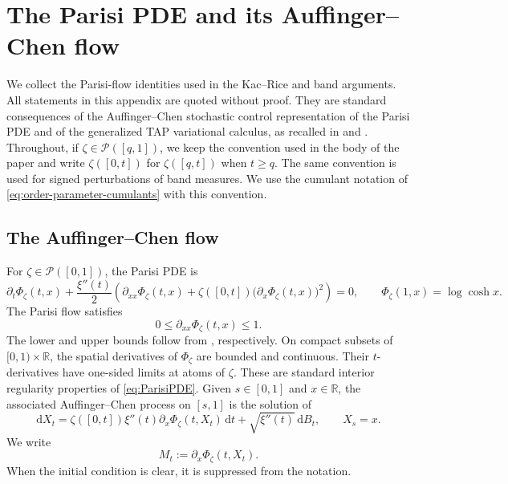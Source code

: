 \documentclass[a4paper,10pt,reqno]{amsart}
\numberwithin{equation}{section}
\newcommand{\dR}{\mathbb{R}}%
\newcommand{\mc}{\mathcal}
\newcommand{\dd}{\mathrm{d}}
\begin{document}
	\appendix
	
	\section{The Parisi PDE and its Auffinger--Chen flow}\label{section:Auffinger}
	
	We collect the Parisi-flow identities used in the Kac--Rice and band
	arguments. All statements in this appendix are quoted without proof. They
	are standard consequences of the Auffinger--Chen stochastic control
	representation of the Parisi PDE and of the generalized TAP variational
	calculus, as recalled in
	\cite{AuffingerChen,AuffingerChenControl,ChenPanchenkoSubag} and
	\cite[Appendix~B]{TAPIsing}.
	Throughout, if $\zeta\in\mc P([q,1])$, we keep the convention used in the
	body of the paper and write $\zeta([0,t])$ for $\zeta([q,t])$ when $t\ge q$.
	The same convention is used for signed perturbations of band measures. We
	use the cumulant notation of \eqref{eq:order-parameter-cumulants} with this
	convention.
	
	\subsection{The Auffinger--Chen flow}
	
	For $\zeta\in\mc P([0,1])$, the Parisi PDE is
	\begin{equation}\label{eq:ParisiPDE}
		\partial_t\Phi_\zeta(t,x)
		+\frac{\xi''(t)}2
		\left(
		\partial_{xx}\Phi_\zeta(t,x)
		+\zeta([0,t])\bigl(\partial_x\Phi_\zeta(t,x)\bigr)^2
		\right)=0,
		\qquad
		\Phi_\zeta(1,x)=\log\cosh x .
	\end{equation}
	The Parisi flow satisfies
	\[
	0\le\partial_{xx}\Phi_\zeta(t,x)\le1.
	\]
	The lower and upper bounds follow from
	\cite[Lemmas~B.5 and~B.2]{TAPIsing}, respectively. On compact subsets of
	\([0,1)\times\mathbb R\), the spatial derivatives of
	\(\Phi_\zeta\) are bounded and continuous. Their \(t\)-derivatives have
	one-sided limits at atoms of \(\zeta\). These are standard interior
	regularity properties of \eqref{eq:ParisiPDE}.
	Given $s\in[0,1]$ and $x\in\dR$, the associated Auffinger--Chen process on $[s,1]$ is the solution of
	\begin{equation}\label{eq:AuffingerChen}
		\dd X_t
		=\zeta([0,t])\xi''(t)\partial_x\Phi_\zeta(t,X_t)\,\dd t
		+\sqrt{\xi''(t)}\,\dd B_t,
		\qquad X_s=x .
	\end{equation}
	We write
	\[
	M_t:=\partial_x\Phi_\zeta(t,X_t).
	\]
	When the initial condition is clear, it is suppressed from the notation.
	
\end{document}
